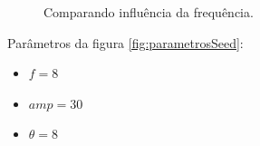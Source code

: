 \begin{figure}[H]
     \centering
     \hspace{0.1cm}
     \hspace{0.1cm}
     \caption{Comparando influência da frequência.}
     \label{fig:parametrosfreq}
\end{figure}

Parâmetros da figura \ref{fig:parametrosSeed}:
\begin{itemize}
    \item $f = 8$
    \item $amp = 30$
    \item $\theta = 8$
\end{itemize}

